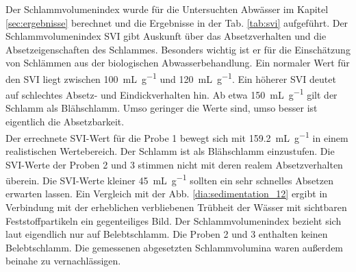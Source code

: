 





Der Schlammvolumenindex wurde für die Untersuchten Abwässer im Kapitel \ref{sec:ergebnisse} berechnet und die Ergebnisse in der Tab. \ref{tab:svi} aufgeführt.
Der Schlammvolumenindex SVI gibt Auskunft über das Absetzverhalten und die Absetzeigenschaften des Schlammes. Besonders wichtig ist er für die Einschätzung von Schlämmen aus der biologischen Abwasserbehandlung.\cite{Dr.ManfredNeupert.August2008} 
Ein normaler Wert für den SVI liegt zwischen \SI{100}{\milli\liter\per\gram} und \SI{120}{\milli\liter\per\gram}. Ein höherer SVI deutet auf schlechtes Absetz- und Eindickverhalten hin. Ab etwa \SI{150}{\milli\liter\per\gram} gilt der Schlamm als Blähschlamm. Umso geringer die Werte sind, umso besser ist eigentlich die Absetzbarkeit.\\
Der errechnete SVI-Wert für die Probe 1 bewegt sich mit \SI{159,2}{\milli\liter\per\gram} in einem realistischen Wertebereich. Der Schlamm ist als Blähschlamm einzustufen. Die SVI-Werte der Proben 2 und 3 stimmen nicht mit deren realem Absetzverhalten überein. Die SVI-Werte kleiner \SI{45}{\milli\liter\per\gram} sollten ein sehr schnelles Absetzen erwarten lassen. Ein Vergleich mit der Abb. \ref{dia:sedimentation_12} ergibt in Verbindung mit der erheblichen verbliebenen Trübheit der Wässer mit sichtbaren Feststoffpartikeln ein gegenteiliges Bild. Der Schlammvolumenindex bezieht sich laut \cite{Dr.ManfredNeupert.August2008} eigendlich nur auf Belebtschlamm. Die Proben 2 und 3 enthalten keinen Belebtschlamm. Die gemessenen abgesetzten Schlammvolumina waren außerdem beinahe zu vernachlässigen. \\




